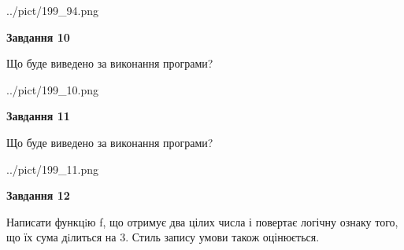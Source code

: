 \documentclass[12pt, ukrainian]{article}
\begin{document}
{\begin {large}
\begin{center}
	{../pict/199_94.png}
\end{center}
\newpage

{\begin {center}\textbf{Завдання 10}\end {center}}

Що буде виведено за виконання програми?\par
\begin{center}
	{../pict/199_10.png}
\end{center}
\newpage

{\begin {center}\textbf{Завдання 11}\end {center}}

Що буде виведено за виконання програми?\par
\begin{center}
	{../pict/199_11.png}
\end{center}
\newpage

{\begin {center}\textbf{Завдання 12}\end {center}}


Написати функцiю f, що отримує два цілих числа і повертає логічну ознаку того, що їх сума дiлиться на 3. Стиль запису умови також оцінюється.\par
\newpage

\end {large}}
\end{document}
